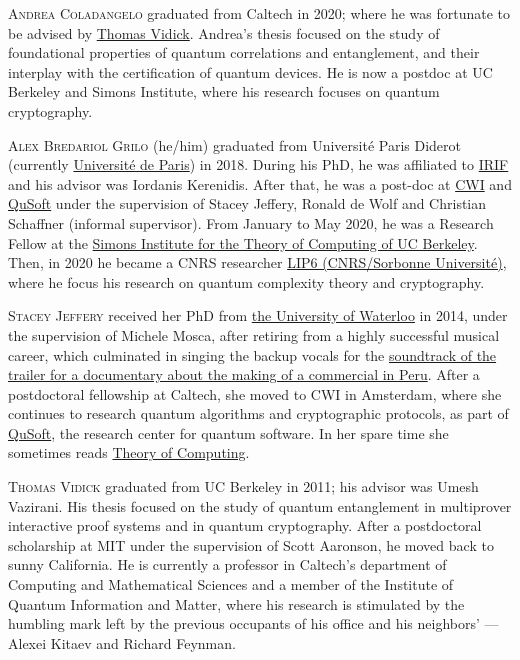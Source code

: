 \begin{tocaboutauthors}
\begin{tocabout}[coladangelo]  %
  \textsc{Andrea Coladangelo} graduated from Caltech in
  2020; where he was fortunate to be advised by
  \href{http://cms.caltech.edu/~vidick}{Thomas Vidick}. Andrea's thesis focused on the study of foundational properties of quantum correlations and entanglement, and their interplay with the certification of quantum devices. He is now a postdoc at UC Berkeley and Simons Institute, where his research focuses on quantum cryptography. 
\end{tocabout}
\begin{tocabout}[grilo]
\textsc{Alex Bredariol Grilo} (he/him) graduated from   Universit\'{e} Paris Diderot (currently   \href{https://u-paris.fr/en/}{Universit\'e de Paris}) in 2018. During his PhD, he was affiliated to  \href{https://www.irif.fr}{IRIF} and his advisor was Iordanis Kerenidis. After that, he was a post-doc at \href{https://cwi.nl}{CWI} and \href{https://qusoft.nl}{QuSoft} under the supervision of Stacey Jeffery, Ronald de Wolf and Christian Schaffner (informal supervisor). From January to May 2020, he was a Research Fellow at the \href{https://simons.berkeley.edu/}{Simons Institute for the Theory of Computing of UC Berkeley}. Then, in 2020 he became a CNRS researcher  \href{https://lip6.fr}{LIP6 (CNRS/Sorbonne Universit\'e)}, where he focus his research on quantum complexity theory and cryptography.
\end{tocabout}
\begin{tocabout}[jeffery]  %
  \textsc{Stacey Jeffery}
  received her PhD from 
  \href{http://uwaterloo.ca}{the University of Waterloo} in
  2014, under the supervision of Michele Mosca, after retiring from a highly successful musical career, which culminated in singing the backup vocals for the \href{https://www.youtube.com/watch?v=S15lHGMdubI}{soundtrack of the trailer for a documentary about the making of a commercial in Peru}. After a postdoctoral fellowship at Caltech, she moved to CWI in Amsterdam, where she continues to research quantum algorithms and cryptographic protocols, as part of \href{http://qusoft.org}{QuSoft}, the research center for quantum software.     In her spare time she sometimes reads
  \href{http://theoryofcomputing.org}{\textsf{Theory of Computing}}.
\end{tocabout}
\begin{tocabout}[vidick]
\textsc{Thomas Vidick} graduated from UC Berkeley in 2011; his advisor was Umesh Vazirani. His thesis focused on the study of quantum entanglement in multiprover interactive proof systems and in quantum cryptography. After a postdoctoral scholarship at MIT under the supervision of Scott Aaronson, he moved back to sunny California. He is currently a professor in Caltech's department of Computing and Mathematical Sciences and a member of the Institute of Quantum Information and Matter, where his research is stimulated by the humbling mark left by the previous occupants of his office and his neighbors' — Alexei Kitaev and Richard Feynman.
\end{tocabout}
\end{tocaboutauthors}




